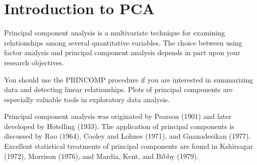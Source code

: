 \section{Introduction to PCA}
Principal component analysis is a multivariate technique for examining relationships
among several quantitative variables. The choice between using factor analysis and
principal component analysis depends in part upon your research objectives. 

You should use the PRINCOMP procedure if you are interested in summarizing data and
detecting linear relationships. Plots of principal components are especially valuable
tools in exploratory data analysis. 



Principal component analysis was originated by Pearson (1901) and later developed
by Hotelling (1933). The application of principal components is discussed by Rao
(1964), Cooley and Lohnes (1971), and Gnanadesikan (1977). Excellent statistical
treatments of principal components are found in Kshirsagar (1972), Morrison (1976),
and Mardia, Kent, and Bibby (1979).



